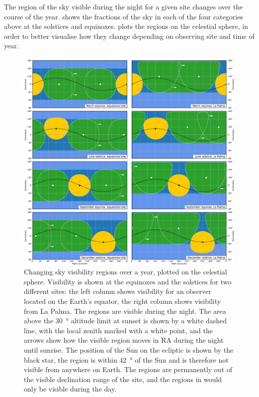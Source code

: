 \begin{colsection}
The region of the sky visible during the night for a given site changes over the course of the year.  shows the fractions of the sky in each of the four categories above at the solstices and equinoxes.  plots the regions on the celestial sphere, in order to better visualise how they change depending on observing site and time of year.

\begin{figure}[p]
    \begin{center}
        \includegraphics[width=\linewidth]{images/visibility.pdf}
    \end{center}
    \caption[Plotting sky visibility regions over a year]{
        Changing sky visibility regions over a year, plotted on the celestial sphere.
        Visibility is shown at the equinoxes and the solstices for two different sites: the left column shows visibility for an observer located on the Earth's equator, the right column shows visibility from La Palma. The  regions are visible during the night. The area above the \SI{30}{\degree} altitude limit at sunset is shown by a white dashed line, with the local zenith marked with a white point, and the arrows show how the visible region moves in RA during the night until sunrise. The position of the Sun on the ecliptic is shown by the black star, the  region is within \SI{42}{\degree} of the Sun and is therefore not visible from anywhere on Earth. The  regions are permanently out of the visible declination range of the site, and the regions in  would only be visible during the day.
    }\label{fig:visibility}
\end{figure}

\clearpage

\end{colsection}

